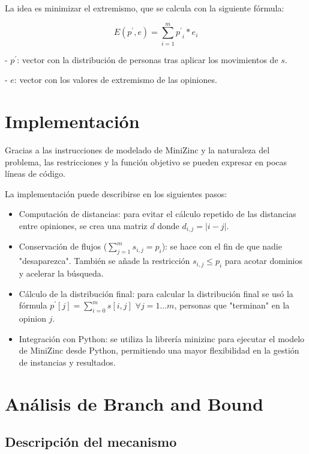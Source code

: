 La idea es minimizar el extremismo, que se calcula con la siguiente fórmula:

\begin{equation}
	E(p^\prime,e) = \sum_{ i = 1 }^m { p^\prime }_i * e_i
\end{equation}

- $p^\prime$: vector con la distribución de personas tras aplicar los movimientos de $s$.

- $e$: vector con los valores de extremismo de las opiniones.

\section{Implementación}

Gracias a las instrucciones de modelado de MiniZinc y la naturaleza del problema, las restricciones y la función objetivo se pueden expresar en pocas líneas de código.

La implementación puede describirse en los siguientes pasos:

\begin{itemize}
	\item Computación de distancias: para evitar el cálculo repetido de las distancias entre opiniones, se crea una matriz $d$ donde $d_{ i,j } = | i - j|$.

	\item Conservación de flujos ($\sum_{ j = 1 }^m s_{ i,j } = p_i$): se hace con el fin de que nadie "desaparezca". También se añade la restricción $s_{ i,j } \leq p_i$ para acotar dominios y acelerar la búsqueda.

	\item Cálculo de la distribución final: para calcular la distribución final se usó la fórmula $p^\prime[j] = \sum_{ i = 0 }^m s[i,j]$ $\forall j = 1\dots m$, personas que "terminan" en la opinion $j$.

	\item Integración con Python: se utiliza la librería minizinc para ejecutar el modelo de MiniZinc desde Python, permitiendo una mayor flexibilidad en la gestión de instancias y resultados.
\end{itemize}

\section{Análisis de Branch and Bound}

\subsection{Descripción del mecanismo}


